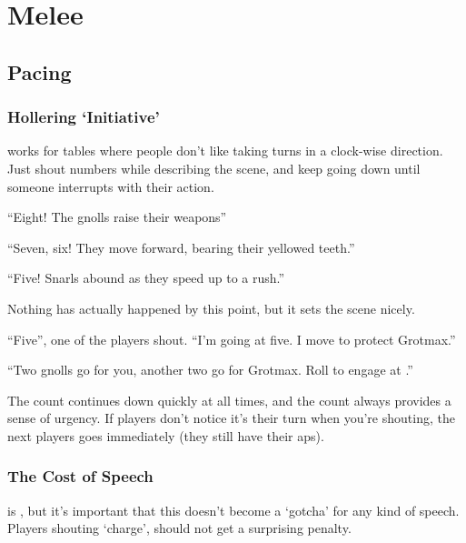 \section{Melee}

\begin{multicols}{2}

\subsection{Pacing}

\subsubsection{Hollering `Initiative'}
works for tables where people don't like taking turns in a clock-wise direction.
Just shout numbers while describing the scene, and keep going down until someone interrupts with their action.

\begin{speechtext}

``Eight! The gnolls raise their weapons''

``Seven, six! They move forward, bearing their yellowed teeth.''

``Five! Snarls abound as they speed up to a rush.''

\end{speechtext}

Nothing has actually happened by this point, but it sets the scene nicely.

\begin{speechtext}

  ``Five'', one of the players shout.
  ``I'm going at five.
  I move to protect Grotmax.''

  ``Two gnolls go for you, another two go for Grotmax.
  Roll to engage at \tn[11].''

\end{speechtext}

The count continues down quickly at all times, and the count always provides a sense of urgency.
If players don't notice it's their turn when you're shouting, the next players goes immediately (they still have their \glspl{ap}).

\subsubsection{The Cost of Speech}
is , but it's important that this doesn't become a `gotcha' for any kind of speech.
Players shouting `charge', should not get a surprising penalty.


\end{multicols}
